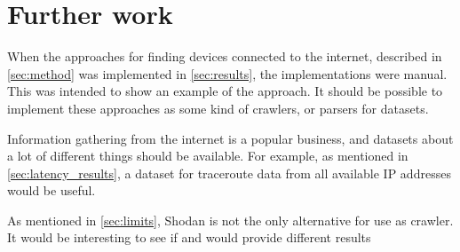 \section{Further work} \label{sec:further_work}
When the approaches for finding devices connected to the internet, described in \cref{sec:method} was implemented in \cref{sec:results}, the implementations were manual. This was intended to show an example of the approach. It should be possible to implement these approaches as some kind of crawlers, or parsers for datasets.

Information gathering from the internet is a popular business, and datasets about a lot of different things should be available. For example, as mentioned in \cref{sec:latency_results}, a dataset for traceroute data from all available IP addresses would be useful. 

As mentioned in \cref{sec:limits}, Shodan is not the only alternative for use as crawler. It would be interesting to see if \href{https://censys.io/}{\color{blue}{Censys}}\cite{censys} and \href{www.zoomeye.org}{\color{blue}{ZoomEye}}\cite{zoomeye} would provide different results
